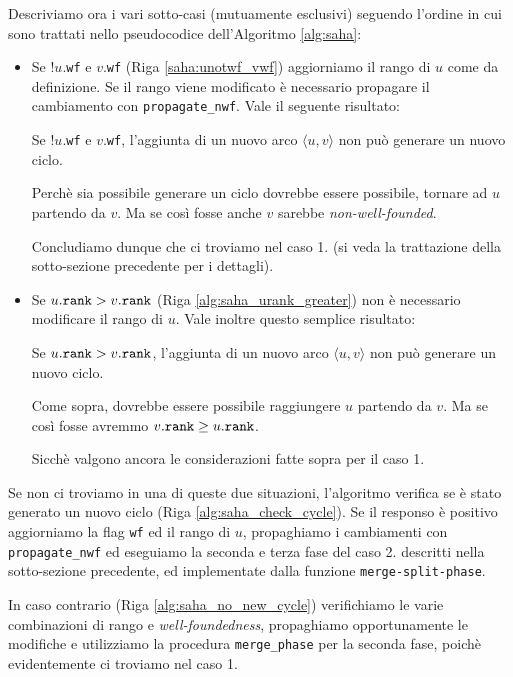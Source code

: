 Descriviamo ora i vari sotto-casi (mutuamente esclusivi) seguendo l'ordine in cui sono trattati nello pseudocodice dell'Algoritmo \ref{alg:saha}:
\begin{itemize}
    \item Se !$u$.\texttt{wf} e $v$.\texttt{wf} (Riga \ref{saha:unotwf_vwf}) aggiorniamo il rango di $u$ come da definizione. Se il rango viene modificato è necessario propagare il cambiamento con \texttt{propagate\_nwf}. Vale il seguente risultato:
    \begin{observation}
        Se !$u$.\texttt{wf} e $v$.\texttt{wf}, l'aggiunta di un nuovo arco $\langle u,v \rangle$ non può generare un nuovo ciclo.
    \end{observation}
    \begin{proof2}
        Perchè sia possibile generare un ciclo dovrebbe essere possibile, tornare ad $u$ partendo da $v$. Ma se così fosse anche $v$ sarebbe \emph{non-well-founded}.
    \end{proof2}
    Concludiamo dunque che ci troviamo nel caso 1. (si veda la trattazione della sotto-sezione precedente per i dettagli).
    \item Se $u.\texttt{\textup{rank}} > v.\texttt{\textup{rank}}$ (Riga \ref{alg:saha_urank_greater}) non è necessario modificare il rango di $u$. Vale inoltre questo semplice risultato:
    \begin{observation}
        Se $u.\texttt{\textup{rank}} > v.\texttt{\textup{rank}}$, l'aggiunta di un nuovo arco $\langle u,v \rangle$ non può generare un nuovo ciclo.
    \end{observation}
    \begin{proof2}
        Come sopra, dovrebbe essere possibile raggiungere $u$ partendo da $v$. Ma se così fosse avremmo $v.\texttt{\textup{rank}} \geq u.\texttt{\textup{rank}}$.
    \end{proof2}
    Sicchè valgono ancora le considerazioni fatte sopra per il caso 1.
\end{itemize}
Se non ci troviamo in una di queste due situazioni, l'algoritmo verifica se è stato generato un nuovo ciclo (Riga \ref{alg:saha_check_cycle}). Se il responso è positivo aggiorniamo la flag \texttt{wf} ed il rango di $u$, propaghiamo i cambiamenti con \texttt{propagate\_nwf} ed eseguiamo la seconda e terza fase del caso 2. descritti nella sotto-sezione precedente, ed implementate dalla funzione \texttt{merge-split-phase}.

In caso contrario (Riga \ref{alg:saha_no_new_cycle}) verifichiamo le varie combinazioni di rango e \emph{well-foundedness}, propaghiamo opportunamente le modifiche e utilizziamo la procedura \texttt{merge\_phase} per la seconda fase, poichè evidentemente ci troviamo nel caso 1.

